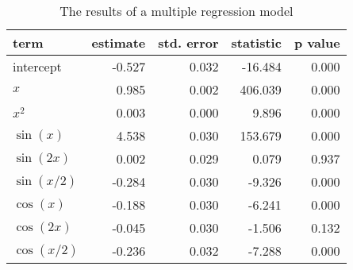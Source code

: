 \begin{table}[t]

\caption{\label{tab:multiple-regression}The results of a multiple regression model}
\centering
\begin{tabular}{lrrrr}
\toprule
term & estimate & std. error & statistic & p value\\
\midrule
intercept & -0.527 & 0.032 & -16.484 & 0.000\\
$x$ & 0.985 & 0.002 & 406.039 & 0.000\\
$x^2$ & 0.003 & 0.000 & 9.896 & 0.000\\
$\sin(x)$ & 4.538 & 0.030 & 153.679 & 0.000\\
$\sin(2x)$ & 0.002 & 0.029 & 0.079 & 0.937\\
$\sin(x/2)$ & -0.284 & 0.030 & -9.326 & 0.000\\
$\cos(x)$ & -0.188 & 0.030 & -6.241 & 0.000\\
$\cos(2x)$ & -0.045 & 0.030 & -1.506 & 0.132\\
$\cos(x/2)$ & -0.236 & 0.032 & -7.288 & 0.000\\
\bottomrule
\end{tabular}
\end{table}